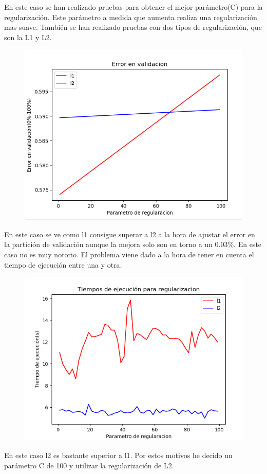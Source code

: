 \documentclass[titlepage]{article}
\begin{document}
	En este caso se han realizado pruebas para obtener el mejor parámetro(C) para la regularización. Este parámetro a medida que aumenta realiza una regularización mas suave. También se han realizado pruebas con dos tipos de regularización, que son la L1 y L2. 
	
	\begin{figure}[H]
		\centering
		\includegraphics[width=0.7\linewidth]{../imagenesRL/graficaRegularizacion}
		\caption{}
		\label{fig:Grafica de regularizacion}
	\end{figure}

	En este caso se ve como l1 consigue superar a l2 a la hora de ajustar el error en la partición de validación aunque la mejora solo son en torno a un 0.03\%. En este caso no es muy notorio. El problema viene dado a la hora de tener en cuenta el tiempo de ejecución entre una y otra. 
	\begin{figure}[H]
		\centering
		\includegraphics[width=0.7\linewidth]{../imagenesRL/tiemposEjecucion}
		\caption{}
		\label{fig:tiemposejecucion}
	\end{figure}
En este caso l2 es bastante superior a l1. Por estos motivos he decido un parámetro C de 100 y utilizar la regularización de L2.
	
\end{document}
